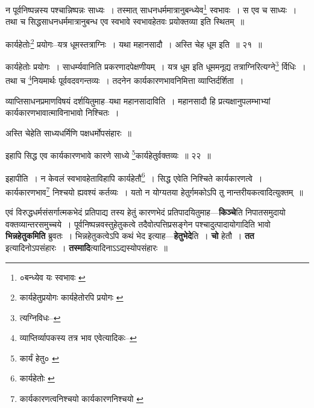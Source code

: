 \documentclass[article,12pt,a4paper]{memoir}
\begin{document}
	  \pstart न पूर्वनिष्पन्नस्य पश्चान्निष्पन्नः साध्यः । तस्मात् साधनधर्ममात्रानुबन्ध्येव\footnote{०बन्ध्येव यः स्वभावः \cite{dp-msB} \cite{dp-msC} \cite{dp-msD} \cite{dp-edE}} स्वभावः । स एव च साध्यः । तथा च सिद्धसाधनधर्ममात्रानुबन्ध एव स्वभावे स्वभावहेतवः प्रयोक्तव्या इति स्थितम् ॥
	\pend
       
	  \bigskip
	  \begingroup
	

	  \pstart कार्यहेतोः\footnote{कार्यहेतुप्रयोगः \cite{dp-msC} कार्यहेतोरपि प्रयोगः \cite{dp-msB} \cite{dp-msD} \cite{dp-edP} \cite{dp-edH} \cite{dp-edE} \cite{dp-edN}} प्रयोगः--यत्र धूमस्तत्राग्निः । यथा महानसादौ । अस्ति चेह धूम इति ॥ २१ ॥
	\pend
      
	  \endgroup
	 

	  \pstart कार्यहेतोः प्रयोगः । साधर्म्यवानिति प्रकरणादपेक्षणीयम् । यत्र धूम इति धूममनूद्य तत्राग्निरित्यग्ने\footnote{त्यग्निविधः--\cite{dp-msB}} र्विधिः । तथा च \footnote{व्याप्तिर्व्यापकस्य तत्र भाव एवेत्यादिकः--\cite{dp-msD-n}}नियमार्थः पूर्ववदवगन्तव्यः । तदनेन कार्यकारणभावनिमित्ता व्याप्तिर्दर्शिता ।
	\pend
       

	  \pstart व्याप्तिसाधनप्रमाणविषयं दर्शयितुमाह--यथा महानसादाविति । महानसादौ हि प्रत्यक्षानुपलम्भाभ्यां कार्यकारणभावात्माविनाभावो निश्चितः ।
	\pend
       

	  \pstart अस्ति चेहेति साध्यधर्मिणि पक्षधर्मोपसंहारः ॥
	\pend
       
	  \bigskip
	  \begingroup
	

	  \pstart इहापि सिद्ध एव कार्यकारणभावे कारणे साध्ये \footnote{कार्यं हेतु० \cite{dp-msC} \cite{dp-msD}}कार्यहेतुर्वक्तव्यः ॥ २२ ॥
	\pend
      
	  \endgroup
	 

	  \pstart इहापीति । न केवलं स्वभावहेताविहापि कार्यहेतौ\footnote{कार्यहेतोः \cite{dp-msB}} । सिद्ध एवेति निश्चिते कार्यकारणत्वे । कार्यकारणभाव\footnote{कार्यकारणत्वनिश्चयो \cite{dp-msA} \cite{dp-edP} \cite{dp-edH} \cite{dp-edN} कार्यकारणनिश्चयो \cite{dp-msC}} निश्चयो ह्यवश्यं कर्तव्यः । यतो न योग्यतया हेतुर्गमकोऽपि तु नान्तरीयकत्वादित्युक्तम् ॥
	\pend
      
	  \endgroup
	

	  \pstart एवं विरुद्धधर्मसंसर्गात्मकभेदं प्रतिपाद्य तस्य हेतुं कारणभेदं प्रतिपादयितुमाह—\textbf{किञ्चे}ति निपातसमुदायो वक्तव्यान्तरसमुच्चये । पूर्वनिष्पन्नवस्तुहेतुकत्वे तदैवोत्पत्तिप्रसङ्गेन पश्चादुत्पादायोगादिति भावो \textbf{भिन्नहेतुकमिति} ब्रुवतः । भिन्नहेतुकत्वेऽपि कथं भेद इत्याह—\textbf{हेतुभेदे}ति । \textbf{चो} हेतौ । \textbf{तत} इत्यादिनोऽपसंहारः । \textbf{तस्मादि}त्यादिनाऽऽद्यस्योपसंहारः ॥
	\pend
      
\end{document}
